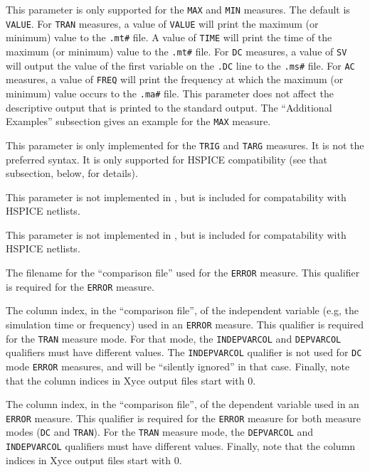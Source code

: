 \begin{Command}
\begin{Arguments}
This parameter is only supported for the {\tt MAX} and {\tt MIN} measures.  The default
is {\tt VALUE}.  For {\tt TRAN} measures, a value of {\tt VALUE} will print the maximum 
(or minimum) value to the \texttt {.mt\#} file.  A value of {\tt TIME} will print the 
time of the maximum (or minimum) value to the \texttt{.mt\#} file. For {\tt DC} measures, 
a value of {\tt SV} will output the value of the first variable on the {\tt .DC} line to 
the \texttt{.ms\#} file.  For {\tt AC} measures, a value of {\tt FREQ} will print the 
frequency at which the maximum (or minimum) value occurs to the \texttt{.ma\#} file.  
This parameter does not affect the descriptive output that is printed to the standard 
output.  The ``Additional Examples'' subsection gives an example for the {\tt MAX} measure. 

This parameter is only implemented for the {\tt TRIG} and {\tt TARG} measures.  It is
not the preferred \Xyce{} syntax. It is only supported for HSPICE compatibility
(see that subsection, below, for details).


This parameter is not implemented in \Xyce{}, but is included for compatability
with HSPICE netlists.


This parameter is not implemented in \Xyce{}, but is included for compatability
with HSPICE netlists.

The filename for the ``comparison file'' used for the {\tt ERROR} measure.  This
qualifier is required for the {\tt ERROR} measure.

The column index, in the ``comparison file'', of the independent variable (e.g, 
the simulation time or frequency) used in an {\tt ERROR} measure.  This qualifier 
is required for the {\tt TRAN} measure mode.  For that mode, the {\tt INDEPVARCOL} 
and {\tt DEPVARCOL} qualifiers must have different values.  The {\tt INDEPVARCOL} 
qualifier is not used for {\tt DC} mode {\tt ERROR} measures, and will be 
``silently ignored'' in that case.  Finally, note that the column indices 
in Xyce output files start with 0.     

The column index, in the ``comparison file'', of the dependent variable
used in an {\tt ERROR} measure.  This qualifier is required for the {\tt ERROR} 
measure for both measure modes ({\tt DC} and {\tt TRAN}).  For the {\tt TRAN} 
measure mode, the  {\tt DEPVARCOL} and {\tt INDEPVARCOL} qualifiers must have 
different values.  Finally, note that the column indices in Xyce output files 
start with 0.


\end{Arguments}
\end{Command}
